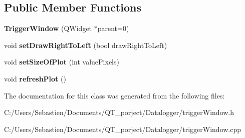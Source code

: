 \subsection*{Public Member Functions}
\begin{DoxyCompactItemize}
\item 
\mbox{\label{class_trigger_window_ad9da4bdf5f844a35fddea81bcd2979a3}} 
{\bfseries Trigger\+Window} (Q\+Widget $\ast$parent=0)
\item 
\mbox{\label{class_trigger_window_a1028700d4a2317d7474f56142011dd03}} 
void {\bfseries set\+Draw\+Right\+To\+Left} (bool draw\+Right\+To\+Left)
\item 
\mbox{\label{class_trigger_window_aecea83091dea4a3ce7fbda4b3300d144}} 
void {\bfseries set\+Size\+Of\+Plot} (int value\+Pixels)
\item 
\mbox{\label{class_trigger_window_a23d01eff1c69090972649f1f1db6f55d}} 
void {\bfseries refresh\+Plot} ()
\end{DoxyCompactItemize}


The documentation for this class was generated from the following files\+:\begin{DoxyCompactItemize}
\item 
C\+:/\+Users/\+Sebastien/\+Documents/\+Q\+T\+\_\+porject/\+Datalogger/trigger\+Window.\+h\item 
C\+:/\+Users/\+Sebastien/\+Documents/\+Q\+T\+\_\+porject/\+Datalogger/trigger\+Window.\+cpp\end{DoxyCompactItemize}
